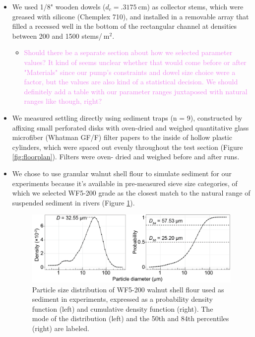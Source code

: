 \documentclass{article}
\begin{document}
\begin{itemize}
    \item We used 1/8" wooden dowels ($d_c = \SI{.3175}{\centi\metre}$) as collector stems, which were greased with silicone (Chemplex 710), and installed in a removable array that filled a recessed well in the bottom of the rectangular channel at densities between 200 and 1500 stems/$\SI{}{\metre^2}$.
    \begin{itemize}
        \item \textcolor{violet}{Should there be a separate section about how we selected parameter values? It kind of seems unclear whether that would come before or after "Materials" since our pump's constraints and dowel size choice were a factor, but the values are also kind of a statistical decision. We should definitely add a table with our parameter ranges juxtaposed with natural ranges like \cite{Fauria_2015} though, right?}
    \end{itemize}
    \item We measured settling directly using sediment traps (n = 9), constructed by affixing small perforated disks with oven-dried and weighed quantitative glass microfiber (Whatman GF/F) filter papers to the inside of hollow plastic cylinders, which were spaced out evenly throughout the test section (Figure \ref{fig:floorplan}). Filters were oven- dried and weighed before and after runs.
    \item We chose to use granular walnut shell flour to simulate sediment for our experiments because it's available in pre-measured sieve size categories, of which we selected WF5-200 grade as the closest match to the natural range of suspended sediment in rivers (Figure \ref{fig:sedsize}).
 \begin{figure}[htbp]
\includegraphics[width=15cm] {wf5-200sizedist.png}
\centering
\caption{Particle size distribution of WF5-200 walnut shell flour used as sediment in experiments, expressed as a probability density function (left) and cumulative density function (right). The mode of the distribution (left) and the 50th and 84th percentiles (right) are labeled.} 
\label{fig:sedsize}
\end{figure}
   




\end{itemize}
\end{document}
